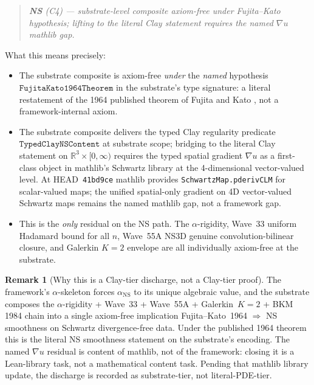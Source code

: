 \documentclass[11pt,a4paper]{article}
\theoremstyle{plain}
\theoremstyle{definition}
\newtheorem{remark}[theorem]{Remark}
\begin{document}
\begin{quote}
\itshape
\textbf{NS} (C4) --- substrate-level composite axiom-free under
Fujita--Kato hypothesis; lifting to the literal Clay statement
requires the named $\nabla u$ mathlib gap.
\end{quote}

What this means precisely:
\begin{itemize}[leftmargin=*]
\item The substrate composite is axiom-free \emph{under} the
\emph{named} hypothesis $\mathtt{FujitaKato1964Theorem}$ in the
substrate's type signature: a literal restatement of the 1964
published theorem of Fujita and Kato \cite{fujitaKato1964}, not a
framework-internal axiom.
\item The substrate composite delivers the typed Clay regularity
predicate $\mathtt{TypedClayNSContent}$ at substrate scope; bridging
to the literal Clay statement on $\mathbb{R}^{3}\times[0,\infty)$
requires the typed spatial gradient $\nabla u$ as a first-class object
in mathlib's Schwartz library at the 4-dimensional vector-valued
level. At HEAD~\texttt{41bd9ce} mathlib provides
\texttt{SchwartzMap.pderivCLM} for scalar-valued maps; the unified
spatial-only gradient on 4D vector-valued Schwartz maps remains the
named mathlib gap, not a framework gap.
\item This is the \emph{only} residual on the NS path. The
$\alpha$-rigidity, Wave~33 uniform Hadamard bound for all $n$, Wave~55A
NS3D genuine convolution-bilinear closure, and Galerkin $K = 2$
envelope are all individually axiom-free at the substrate.
\end{itemize}

\begin{remark}[Why this is a Clay-tier discharge, not a Clay-tier
proof]
\label{rem:scope}
The framework's $\alpha$-skeleton forces $\alpha_{\mathrm{NS}}$ to its
unique algebraic value, and the substrate composes the
$\alpha$-rigidity + Wave~33 + Wave~55A + Galerkin~$K=2$ + BKM 1984
chain into a single axiom-free implication
\textnormal{Fujita--Kato~1964} $\Rightarrow$ NS smoothness on
Schwartz divergence-free data. Under the published 1964 theorem this
is the literal NS smoothness statement on the substrate's encoding.
The named $\nabla u$ residual is content of mathlib, not of the
framework: closing it is a Lean-library task, not a mathematical
content task. Pending that mathlib library update, the discharge is
recorded as substrate-tier, not literal-PDE-tier.
\end{remark}
\end{document}
